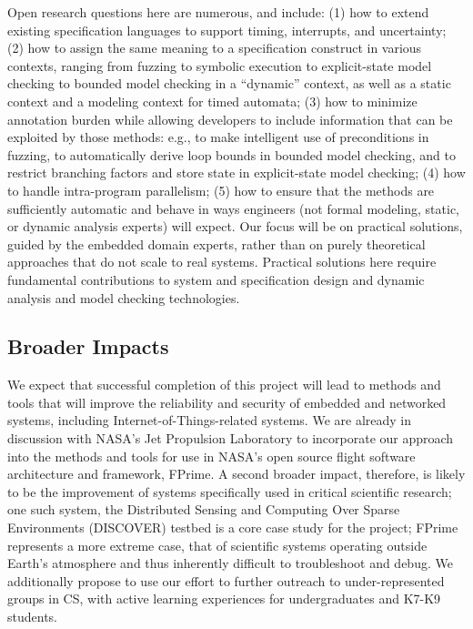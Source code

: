 \documentclass[11pt]{article}
\begin{document}
Open research questions here are numerous, and include: (1) how to extend existing specification languages to support timing, interrupts, and uncertainty; (2) how to assign the same meaning to a specification construct in various contexts, ranging from fuzzing to symbolic execution to explicit-state model checking to bounded model checking in a ``dynamic'' context, as well as a static context and a modeling context for timed automata; (3) how to minimize annotation burden while allowing developers to include information that can be exploited by those methods: e.g., to make intelligent use of preconditions in fuzzing, to automatically derive loop bounds in bounded model checking, and to restrict branching factors and store state in explicit-state model checking; (4) how to handle intra-program parallelism; (5) how to ensure that the methods are sufficiently automatic and behave in ways engineers (not formal modeling, static, or dynamic analysis experts) will expect. Our focus will be on practical solutions, guided by the embedded domain experts, rather than on purely theoretical approaches that do not scale to real systems. Practical solutions here require fundamental contributions to system and specification design and dynamic analysis and model checking technologies.

\subsection*{Broader Impacts}

We expect that successful completion of this project will lead to methods and tools that will improve the reliability and security of embedded and networked systems, including Internet-of-Things-related systems. We are already in discussion with NASA's Jet Propulsion Laboratory to incorporate our approach into the methods and tools for use in NASA's open source flight software architecture and framework, FPrime. A second broader impact, therefore, is likely to be the improvement of systems specifically used in critical scientific research; one such system,
the Distributed Sensing and Computing Over Sparse Environments (DISCOVER) testbed is a core case study for the project; FPrime represents a more extreme case, that of scientific systems operating outside Earth's atmosphere and thus inherently difficult to troubleshoot and debug.  We additionally propose to use our effort to further outreach to under-represented groups in CS, with active learning experiences for undergraduates and K7-K9 students.
\end{document}
